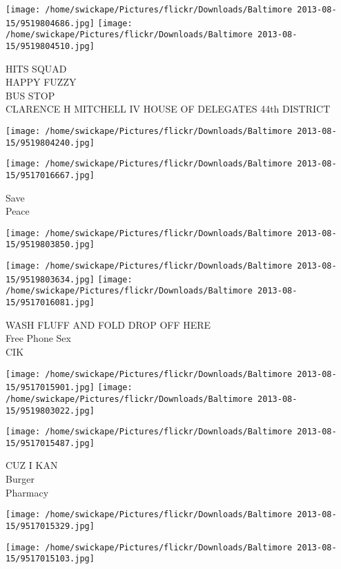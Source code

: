 \documentclass[10pt,letterpaper]{article}
\begin{document}
\texttt{[image: /home/swickape/Pictures/flickr/Downloads/Baltimore 2013-08-15/9519804686.jpg]}
\texttt{[image: /home/swickape/Pictures/flickr/Downloads/Baltimore 2013-08-15/9519804510.jpg]}

HITS SQUAD\\
HAPPY FUZZY\\
BUS STOP\\
CLARENCE H MITCHELL IV HOUSE OF DELEGATES 44th DISTRICT
\pagebreak

\texttt{[image: /home/swickape/Pictures/flickr/Downloads/Baltimore 2013-08-15/9519804240.jpg]}

\vspace{0.25in}
\texttt{[image: /home/swickape/Pictures/flickr/Downloads/Baltimore 2013-08-15/9517016667.jpg]}

Save\\
Peace
\pagebreak

\texttt{[image: /home/swickape/Pictures/flickr/Downloads/Baltimore 2013-08-15/9519803850.jpg]}

\vspace{0.25in}
\texttt{[image: /home/swickape/Pictures/flickr/Downloads/Baltimore 2013-08-15/9519803634.jpg]}
\texttt{[image: /home/swickape/Pictures/flickr/Downloads/Baltimore 2013-08-15/9517016081.jpg]}

WASH FLUFF AND FOLD DROP OFF HERE\\
Free Phone Sex\\
CIK
\pagebreak

\texttt{[image: /home/swickape/Pictures/flickr/Downloads/Baltimore 2013-08-15/9517015901.jpg]}
\texttt{[image: /home/swickape/Pictures/flickr/Downloads/Baltimore 2013-08-15/9519803022.jpg]}

\vspace{0.25in}
\texttt{[image: /home/swickape/Pictures/flickr/Downloads/Baltimore 2013-08-15/9517015487.jpg]}

CUZ I KAN\\
Burger\\
Pharmacy
\pagebreak

\texttt{[image: /home/swickape/Pictures/flickr/Downloads/Baltimore 2013-08-15/9517015329.jpg]}

\vspace{0.25in}
\texttt{[image: /home/swickape/Pictures/flickr/Downloads/Baltimore 2013-08-15/9517015103.jpg]}
\end{document}
